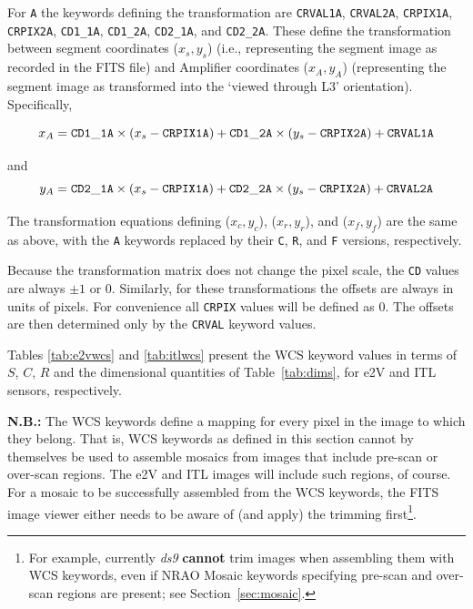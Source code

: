 \documentclass{article}[12pt]
\begin{document}
For {\tt A} the keywords defining the transformation are {\tt CRVAL1A}, {\tt CRVAL2A}, {\tt CRPIX1A}, {\tt CRPIX2A}, {\tt CD1\_1A}, {\tt CD1\_2A}, {\tt CD2\_1A}, and {\tt CD2\_2A}.  These define the transformation between segment coordinates ($x_s, y_s$) (i.e., representing the segment image as recorded in the FITS file) and Amplifier coordinates ($x_A, y_A$) (representing the segment image as transformed into the `viewed through L3' orientation).  Specifically,

\begin{equation}
x_A = {\tt CD1\_1A} \times (x_s -{\tt CRPIX1A}) + {\tt CD1\_2A} \times (y_s - {\tt CRPIX2A}) + {\tt CRVAL1A}
\end{equation}

and
\begin{equation}
y_A = {\tt CD2\_1A} \times (x_s - {\tt CRPIX1A}) + {\tt CD2\_2A} \times (y_s - {\tt CRPIX2A}) + {\tt CRVAL2A}
\end{equation}

The transformation equations defining ($x_c, y_c$), ($x_r, y_r$), and ($x_f, y_f$) are the same as above, with the {\tt A} keywords replaced by their {\tt C}, {\tt R}, and {\tt F} versions, respectively.

Because the transformation matrix does not change the pixel scale, the {\tt CD} values are always $\pm1$ or 0.  Similarly, for these transformations the offsets are always in units of pixels.  For convenience all {\tt CRPIX} values will be defined as 0.  The offsets are then determined only by the {\tt CRVAL} keyword values.

Tables \ref{tab:e2vwcs} and \ref{tab:itlwcs} present the WCS keyword values in terms of $S$, $C$, $R$ and the dimensional quantities of Table~\ref{tab:dims}, for e2V and ITL sensors, respectively.  

{\bf N.B.:}  The WCS keywords define a mapping for every pixel in the image to which they belong.  That is, WCS keywords as defined in this section cannot by themselves be used to assemble mosaics from images that include pre-scan or over-scan regions.  The e2V and ITL images will include such regions, of course.  For a mosaic to be successfully assembled from the WCS keywords, the FITS image viewer either needs to be aware of (and apply) the trimming first\footnote{For example, currently {\it ds9} {\bf cannot} trim images when assembling them with WCS keywords, even if NRAO Mosaic keywords specifying pre-scan and over-scan regions are present; see Section~\ref{sec:mosaic}.}.
\end{document}
